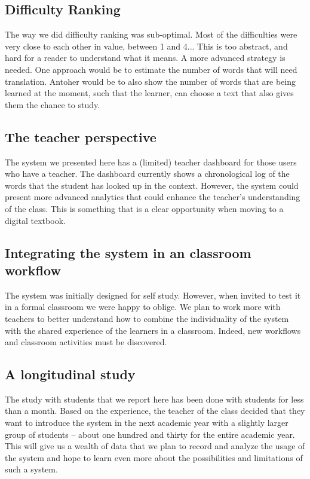 \subsection{Difficulty Ranking}
The way we did difficulty ranking was sub-optimal. Most of the difficulties were very close to each other in value, between 1 and 4... This is too abstract, and hard for a reader to understand what it means. A more advanced strategy is needed. One approach would be to estimate the number of words that will need translation. Antoher would be to also show the number of words that are being learned at the moment, such that the learner, can choose a text that also gives them the chance to study. 

\subsection{The teacher perspective}
The system we presented here has a (limited) teacher dashboard for those users who have a teacher. The dashboard currently shows a chronological log of the words that the student has looked up in the context. However, the system could present more advanced analytics that could enhance the teacher's understanding of the class. This is something that is a clear opportunity when moving to a digital textbook. 

\subsection{Integrating the system in an classroom workflow}
The system was initially designed for self study. However, when invited to test it in a formal classroom we were happy to oblige. We plan to work more with teachers to better understand how to combine the individuality of the system with the shared experience of the learners in a classroom. Indeed, new workflows and classroom activities must be discovered.

\subsection{A longitudinal study}
The study with students that we report here has been done with \stcnt students for less than a month. Based on the experience, the teacher of the class decided that they want to introduce the system in the next academic year with a slightly larger group of students -- about one hundred and thirty for the entire academic year. This will give us a wealth of data that we plan to record and analyze the usage of the system and hope to learn even more about the possibilities and limitations of such a system. 

